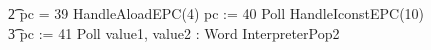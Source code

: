\begin{figure}[t!]
\begin{circus}
    \t2 {} \circelse pc = 39 \circthen HandleAloadEPC(4) \circseq pc := 40 \circseq Poll \circseq HandleIconstEPC(10) \circseq \\
    \t3 pc := 41 \circseq Poll \circseq \circvar value1, value2 : Word \circspot InterpreterPop2 \circseq \\

\end{circus}
\end{figure}
